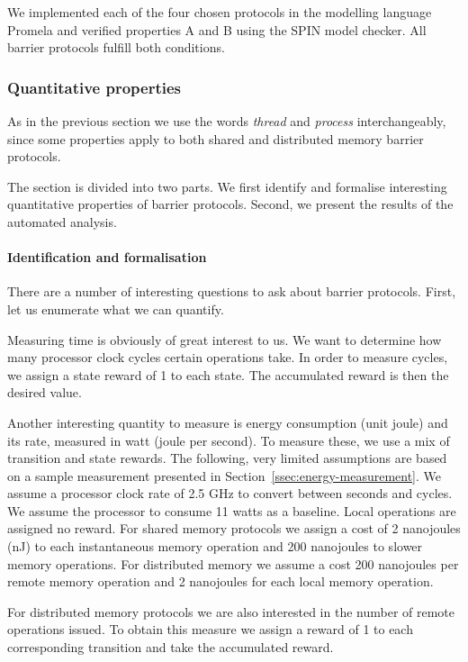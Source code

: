 \documentclass[a4paper, 10pt]{article}
\begin{document}
We implemented each of the four chosen protocols in the modelling language Promela and verified properties A and B using the SPIN model checker.
All barrier protocols fulfill both conditions.

\subsubsection{Quantitative properties}
\label{sssec:analysis-modelchecking-quantitative-properties}
As in the previous section we use the words \emph{thread} and \emph{process} interchangeably, since some properties apply to both shared and distributed memory barrier protocols.

The section is divided into two parts. We first identify and formalise interesting quantitative properties of barrier protocols. Second, we present the results of the automated analysis.

\paragraph{Identification and formalisation}
\label{ssssec:analysis-modelchecking-quantitative-properties-identification}
There are a number of interesting questions to ask about barrier protocols. First, let us enumerate what we can quantify.

Measuring time is obviously of great interest to us. We want to determine how many processor clock cycles certain operations take. In order to measure cycles, we assign a state reward of 1 to each state. The accumulated reward is then the desired value.

Another interesting quantity to measure is energy consumption (unit joule) and its rate, measured in watt (joule per second).
To measure these, we use a mix of transition and state rewards.
The following, very limited assumptions are based on a sample measurement presented in Section~\ref{ssec:energy-measurement}.
We assume a processor clock rate of 2.5 GHz to convert between seconds and cycles.
We assume the processor to consume 11 watts as a baseline.
Local operations are assigned no reward.
For shared memory protocols we assign a cost of 2 nanojoules (nJ) to each instantaneous memory operation and 200 nanojoules to slower memory operations.
For distributed memory we assume a cost 200 nanojoules per remote memory operation and 2 nanojoules for each local memory operation.

For distributed memory protocols we are also interested in the number of remote operations issued. To obtain this measure we assign a reward of 1 to each corresponding transition and take the accumulated reward.
\end{document}
